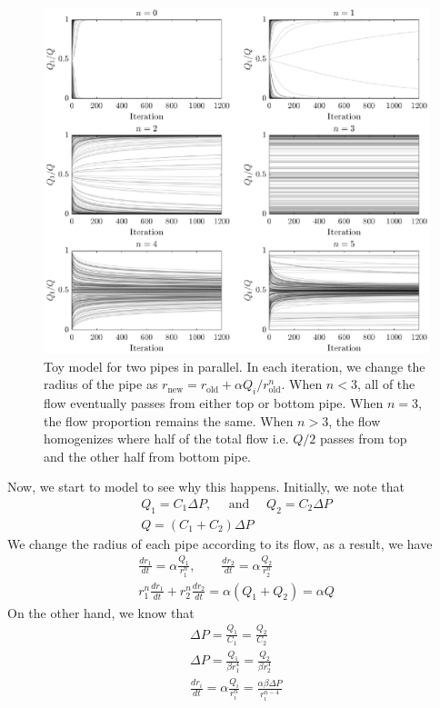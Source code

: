 \begin{figure}[!h]
  \centerline{\includegraphics[width=1\textwidth]{./Figs/toy-model-par}}
  \caption{Toy model for two pipes in parallel. In each iteration, we
    change the radius of the pipe as
    $r_{\text{new}} = r_{\text{old}} + \alpha
    Q_{i}/r_{\text{old}}^n$. When $n<3$, all of the flow eventually
    passes from either top or bottom pipe. When $n=3$, the flow
    proportion remains the same. When $n>3$, the flow homogenizes
    where half of the total flow i.e. $Q/2$ passes from top and the
    other half from bottom pipe.}
\label{toy-par}
\end{figure}  

Now, we start to model to see why this happens. Initially, we note
that
%
\begin{align}
  Q_1 = C_1 \Delta P, \quad \text{ and }\quad Q_2 = C_2 \Delta P \\
  Q = (C_1 + C_2) \Delta P
\end{align}
%
We change the radius of each pipe according to its flow, as a result,
we have
%
\begin{align}
  \frac{dr_{1}}{dt}  = \alpha \frac{Q_{1}}{r_{1}^n}, \qquad  \frac{dr_{2}}{dt}  = \alpha \frac{Q_{2}}{r_{2}^n} \\
  r_1^n \frac{dr_{1}}{dt}  + r_2^n \frac{dr_{2}}{dt}  = \alpha (Q_1 + Q_2) = \alpha Q  
\end{align}
%
On the other hand, we know that
%
\begin{align}
  \Delta P = \frac{Q_{1}}{C_{1}}  = \frac{Q_{2}}{C_{2}} \\
  \Delta P = \frac{Q_{1}}{\beta r_1^{4}}  = \frac{Q_{2}}{\beta r_2^{4}}   \\
  \frac{dr_{i}}{dt}  = \alpha \frac{Q_{i}}{r^{n}_{i}} = \frac{\alpha \beta \Delta P}{r^{n-4}_{i}}   
\end{align}
%

